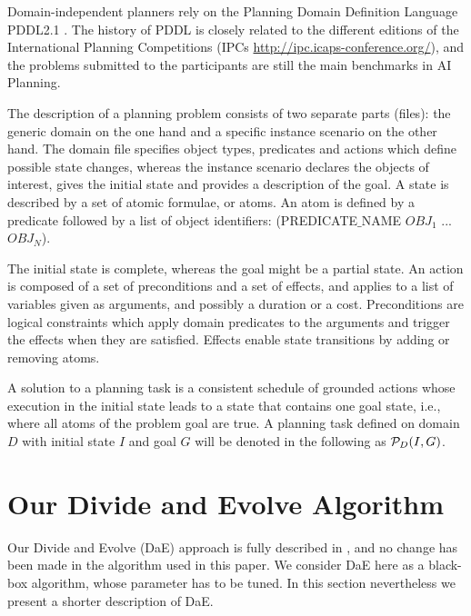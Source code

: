 \documentclass{acm_proc_article-sp}
\begin{document}
Domain-independent planners rely on the Planning Domain Definition Language PDDL2.1 \cite{Fox-JAIR-2003}. The history of PDDL is closely related to the different editions of the International Planning Competitions (IPCs \url{http://ipc.icaps-conference.org/}), and the problems submitted to the participants are still the main benchmarks in AI Planning.

The description of a planning problem consists of two separate parts (files): the generic domain on the one hand and a specific instance scenario on the other hand. The domain file specifies object types, predicates and actions which define possible state changes, whereas the instance scenario declares the objects of interest, gives the initial state and provides a description of the goal. A state is described by a set of atomic formulae, or atoms. An atom is defined by a predicate followed by a list of object identifiers: (PREDICATE$\_$NAME $OBJ_1$ ... $OBJ_N$). 

The initial state is complete, whereas the goal might be a partial state. An action is composed of a set of preconditions and a set of effects, and applies to a list of variables given as arguments, and possibly a duration or a cost. Preconditions are logical constraints which apply domain predicates to the arguments and trigger the effects when they are satisfied. Effects enable state transitions by adding or removing atoms.

A solution to a planning task is a consistent schedule of grounded actions whose execution in the initial state leads to a state that contains one goal state, i.e., where all atoms of the problem goal are true. A planning task defined on domain $D$ with initial state $I$ and goal $G$ will be denoted in the following as ${\cal P}_D(I,G)$.

\section{Our Divide and Evolve Algorithm}
\label{section:dae}

Our Divide and Evolve (DaE) approach is fully described in \cite{BibEvoCop:2010}, and no change has been made in the algorithm used in this paper. We consider DaE here as a black-box algorithm, whose parameter has to be tuned. In this section nevertheless we present a shorter description of DaE.
\end{document}
